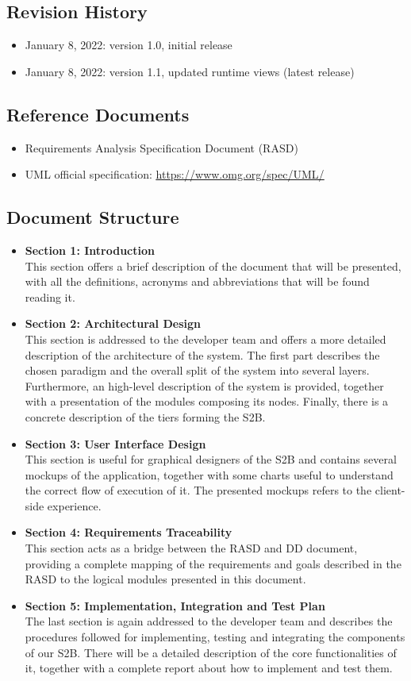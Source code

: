 \subsection{Revision History}
\begin{itemize}
    \item January 8, 2022: version 1.0, initial release
    \item January 8, 2022: version 1.1, updated runtime views (latest release)
\end{itemize}
\subsection{Reference Documents}
\begin{itemize}
    \item Requirements Analysis Specification Document (RASD)
    \item UML official specification: \underline{\url{https://www.omg.org/spec/UML/}}
\end{itemize}
\subsection{Document Structure}
\begin{itemize}
    \item \textbf{Section 1: Introduction}\\This section offers a brief description of the document that will be presented, with all the definitions, acronyms and abbreviations that will be found reading it.
    \item \textbf{Section 2: Architectural Design}\\This section is addressed to the developer team and offers a more detailed description of the architecture of the system. The first part describes the chosen paradigm and the overall split of the system into several layers. Furthermore, an high-level description of the system is provided, together with a presentation of the modules composing its nodes. Finally, there is a concrete description of the tiers forming the S2B.
    \item \textbf{Section 3: User Interface Design}\\This section is useful for graphical designers of the S2B and contains several mockups of the application, together with some charts useful to understand the correct flow of execution of it. The presented mockups refers to the client-side experience.
    \item \textbf{Section 4: Requirements Traceability}\\This section acts as a bridge between the RASD and DD document, providing a complete mapping of the requirements and goals described in the RASD to the logical modules presented in this document.
    \item \textbf{Section 5: Implementation, Integration and Test Plan}\\The last section is again addressed to the developer team and describes the procedures followed for implementing, testing and integrating the components of our S2B. There will be a detailed description of the core functionalities of it, together with a complete report about how to implement and test them.
\end{itemize}
